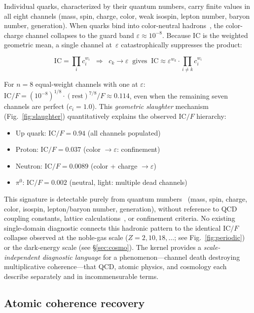 \documentclass[11pt]{article}
\newcommand{\eps}{\varepsilon}
\newcommand{\IC}{\mathrm{IC}}
\begin{document}
Individual quarks, characterized by their quantum numbers, carry
finite values in all eight channels (mass, spin, charge, color,
weak isospin, lepton number, baryon number, generation). When
quarks bind into color-neutral hadrons~\cite{wilson1974confinement},
the color-charge channel collapses to the guard band
$\eps \approx 10^{-8}$. Because $\IC$ is the weighted geometric
mean, a single channel at~$\eps$ catastrophically suppresses
the product:

\begin{equation}
  \IC = \prod_i c_i^{w_i} \;\;\Longrightarrow\;\;
  c_k \to \eps \;\;\text{gives}\;\;
  \IC \approx \eps^{w_k} \cdot \prod_{i \neq k} c_i^{w_i}
  \label{eq:slaughter}
\end{equation}

For $n = 8$ equal-weight channels with one at $\eps$:
$\IC/F = (10^{-8})^{1/8} \cdot (\text{rest})^{7/8} / F
\approx 0.114$,
even when the remaining seven channels are perfect
($c_i = 1.0$). This \emph{geometric slaughter} mechanism
(Fig.~\ref{fig:slaughter}) quantitatively explains the observed
$\IC/F$ hierarchy:

\begin{itemize}[leftmargin=1.5em,itemsep=1pt]
\item Up quark: $\IC/F = 0.94$ (all channels populated)
\item Proton: $\IC/F = 0.037$ (color $\to \eps$: confinement)
\item Neutron: $\IC/F = 0.0089$ (color + charge $\to \eps$)
\item $\pi^0$: $\IC/F = 0.002$ (neutral, light: multiple
  dead channels)
\end{itemize}

This signature is detectable purely from quantum
numbers~\cite{pdg2024} (mass, spin, charge, color, isospin,
lepton/baryon number, generation), without reference to
QCD coupling constants, lattice calculations~\cite{aoki2006lattice},
or confinement criteria. No existing single-domain diagnostic
connects this hadronic pattern to the identical $\IC/F$ collapse
observed at the noble-gas scale ($Z = 2, 10, 18, \ldots$; see
Fig.~\ref{fig:periodic}) or the dark-energy scale (see
\S\ref{sec:cosmo}). The kernel provides a \emph{scale-independent
diagnostic language} for a phenomenon---channel death destroying
multiplicative coherence---that QCD, atomic physics, and cosmology
each describe separately and in incommensurable terms.

\subsection{Atomic coherence recovery}
\end{document}
